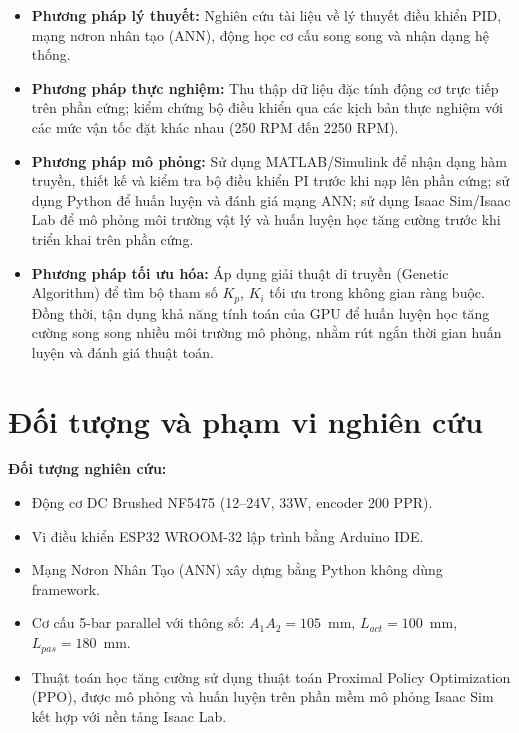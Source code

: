 \begin{itemize}[leftmargin=1.5cm]
    \item \textbf{Phương pháp lý thuyết:} Nghiên cứu tài liệu về lý thuyết điều khiển
    PID, mạng nơron nhân tạo (ANN), động học cơ cấu song song và nhận dạng hệ thống.

    \item \textbf{Phương pháp thực nghiệm:} Thu thập dữ liệu đặc tính động cơ trực
    tiếp trên phần cứng; kiểm chứng bộ điều khiển qua các kịch bản thực nghiệm với
    các mức vận tốc đặt khác nhau (250 RPM đến 2250 RPM).

    \item \textbf{Phương pháp mô phỏng:} Sử dụng MATLAB/Simulink để nhận dạng hàm
    truyền, thiết kế và kiểm tra bộ điều khiển PI trước khi nạp lên phần cứng; sử dụng
    Python để huấn luyện và đánh giá mạng ANN; sử dụng Isaac Sim/Isaac Lab để mô phỏng
    môi trường vật lý và huấn luyện học tăng cường trước khi triển khai trên phần cứng.

    \item \textbf{Phương pháp tối ưu hóa:} Áp dụng giải thuật di truyền (Genetic
    Algorithm) để tìm bộ tham số $K_p$, $K_i$ tối ưu trong không gian ràng buộc. Đồng thời,
    tận dụng khả năng tính toán của GPU để huấn luyện học tăng cường song song nhiều môi trường mô phỏng,
    nhằm rút ngắn thời gian huấn luyện và đánh giá thuật toán.
\end{itemize}


\section{Đối tượng và phạm vi nghiên cứu}

\textbf{Đối tượng nghiên cứu:}
\begin{itemize}[leftmargin=1.5cm]
    \item Động cơ DC Brushed NF5475 (12--24V, 33W, encoder 200 PPR).
    \item Vi điều khiển ESP32 WROOM-32 lập trình bằng Arduino IDE.
    \item Mạng Nơron Nhân Tạo (ANN) xây dựng bằng Python không dùng framework.
    \item Cơ cấu 5-bar parallel với thông số: $A_1A_2 = 105$~mm,
    $L_{act} = 100$~mm, $L_{pas} = 180$~mm.
    \item Thuật toán học tăng cường sử dụng thuật toán Proximal Policy Optimization (PPO),
    được mô phỏng và huấn luyện trên phần mềm mô phỏng Isaac Sim kết hợp với nền tảng Isaac Lab.
\end{itemize}

